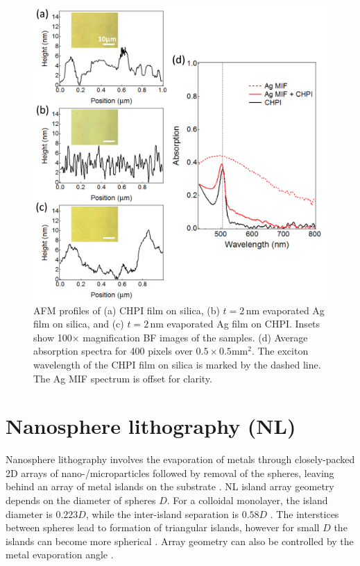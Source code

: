 \begin{figure}[h!] 
\centering    
\includegraphics[width=\textwidth]{Fig8}
\caption{AFM profiles of (a) CHPI film on silica, (b) $t=2$\,nm evaporated Ag film on silica, and (c) $t=2$\,nm evaporated Ag film on CHPI. Insets show 100$\times$ magnification BF images of the samples. (d) Average absorption spectra for 400 pixels over $0.5\times0.5$mm$^2$. The exciton wavelength of the CHPI film on silica is marked by the dashed line. The Ag MIF spectrum is offset for clarity.}
\label{6Fig8}
\end{figure}

\section{Nanosphere lithography (NL)}
Nanosphere lithography involves the evaporation of metals through closely-packed 2D arrays of nano-/microparticles followed by removal of the spheres, leaving behind an array of metal islands on the substrate \cite{Haynes2001}. NL island array geometry depends on the diameter of spheres $D$. For a colloidal monolayer, the island diameter is $0.223D$, while the inter-island separation is $0.58D$ \cite{Hulteen1995}. The interstices between spheres lead to formation of triangular islands, however for small $D$ the islands can become more spherical \cite{Hulteen1999}. Array geometry can also be controlled by the metal evaporation angle \cite{Haynes2002}.

